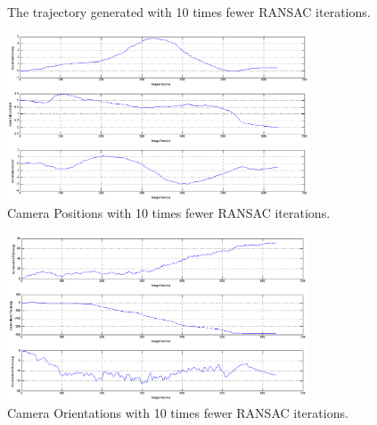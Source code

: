 \documentclass[letter, 10pt]{article}
\begin{document}
\begin{onehalfspacing}
\begin{enumerate}[leftmargin=2em,label={\alph*)}]
\begin{itemize}
\begin{figure}[h!]
	\centering
	\caption{The trajectory generated with 10 times fewer RANSAC iterations.}
	\label{traj_iter}
\end{figure}

\begin{figure}[h!]
	\centering
	\includegraphics[width=0.8\textwidth]{position_adjusted_iter.png}
	\caption{Camera Positions with 10 times fewer RANSAC iterations.}
	\label{pos_iter}
\end{figure}

\begin{figure}[h!]
	\centering
	\includegraphics[width=0.8\textwidth]{orientation_iter.png}
	\caption{Camera Orientations with 10 times fewer RANSAC iterations.}
	\label{orient_iter}
\end{figure}


\end{itemize}
\end{enumerate}
\end{onehalfspacing}
\end{document}
